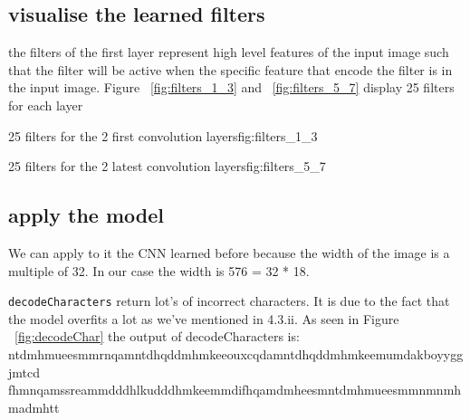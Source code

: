 \documentclass{article}
\begin{document}
\subsection{visualise the learned filters}

the filters of the first layer represent high level features of the input image such that the filter will be active when the specific feature that encode the filter is in the input image. Figure ~\ref{fig:filters_1_3} and ~\ref{fig:filters_5_7} display 25 filters for each layer

           {}
           {25 filters for the 2 first convolution layers}{fig:filters_1_3}
					
           {}
           {25 filters for the 2 latest convolution layers}{fig:filters_5_7}


\subsection{apply the model}

We can apply to it the CNN learned before because the width of the image is a multiple of 32. In our case the width is 576 = 32 * 18.


\texttt{decodeCharacters} return lot's of incorrect characters. It is due to the fact that the model overfits a lot as we've mentioned in  4.3.ii. As seen in Figure ~\ref{fig:decodeChar}
the output of decodeCharacters is: \\
ntdmhmueesmmrnqamntdhqddmhmkeeouxcqdamntdhqddmhmkeemumdakboyyggjmtcd \\
fhmnqamssreammdddhlkudddhmkeemmdifhqamdmheesmntdmhmueesmmnmnmhmadmhtt \\
\end{document}
